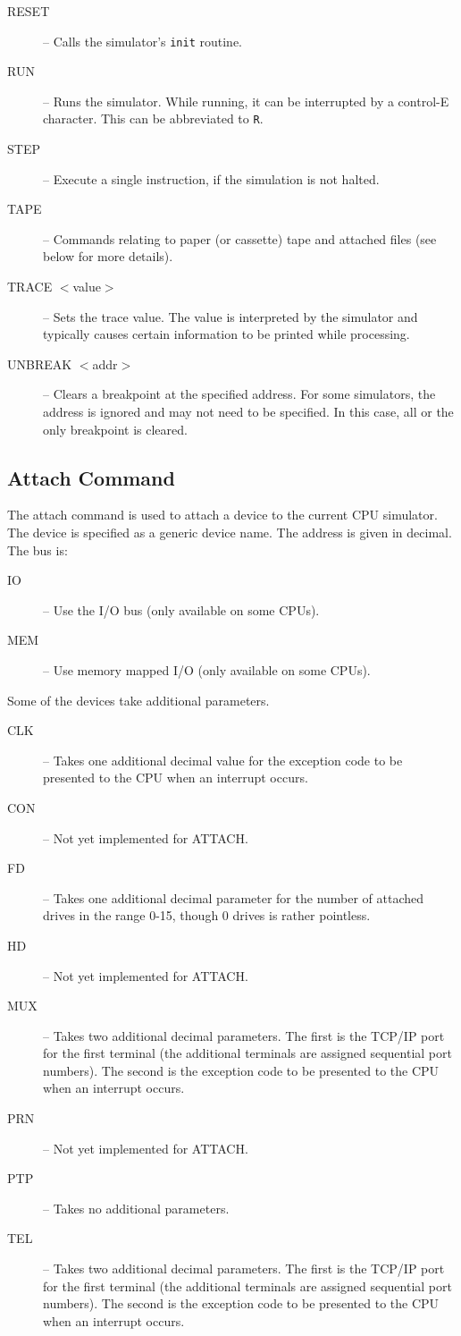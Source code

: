 \documentclass[10pt, openany]{book}
\begin{document}
\begin{description}
  \item[RESET] -- Calls the simulator's \verb|init| routine.
  \item[RUN] -- Runs the simulator.  While running, it can be interrupted by a control-E character.  This can be abbreviated to \verb|R|.
  \item[STEP] -- Execute a single instruction, if the simulation is not halted.
  \item[TAPE] -- Commands relating to paper (or cassette) tape and attached files (see below for more details).
  \item[TRACE $<$value$>$] -- Sets the trace value.  The value is interpreted by the simulator and typically causes certain information to be printed while processing.
  \item[UNBREAK $<$addr$>$] -- Clears a breakpoint at the specified address.  For some simulators, the address is ignored and may not need to be specified.  In this case, all or the only breakpoint is cleared.
\end{description}

\subsection{Attach Command}
The attach command is used to attach a device to the current CPU simulator.  The device is specified as a generic device name.  The address is given in decimal.  The bus is:
\begin{description}
  \item[IO] -- Use the I/O bus (only available on some CPUs).
  \item[MEM] -- Use memory mapped I/O (only available on some CPUs).
\end{description}
Some of the devices take additional parameters.
\begin{description}
  \item[CLK] -- Takes one additional decimal value for the exception code to be presented to the CPU when an interrupt occurs.
  \item[CON] -- Not yet implemented for ATTACH.
  \item[FD] -- Takes one additional decimal parameter for the number of attached drives in the range 0-15, though 0 drives is rather pointless.
  \item[HD] -- Not yet implemented for ATTACH.
  \item[MUX] -- Takes two additional decimal parameters.  The first is the TCP/IP port for the first terminal (the additional terminals are assigned sequential port numbers).  The second is the exception code to be presented to the CPU when an interrupt occurs.
  \item[PRN] -- Not yet implemented for ATTACH.
  \item[PTP] -- Takes no additional parameters.
  \item[TEL] --  Takes two additional decimal parameters.  The first is the TCP/IP port for the first terminal (the additional terminals are assigned sequential port numbers).  The second is the exception code to be presented to the CPU when an interrupt occurs.
\end{description}
\end{document}
